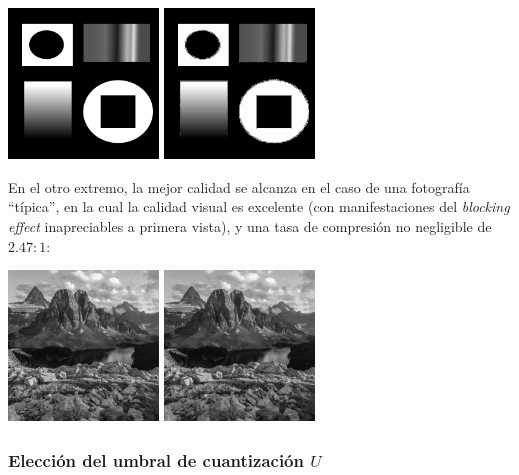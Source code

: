 \documentclass{article}
\begin{document}
\begin{center}
\includegraphics[width=4cm]{../imgs/input/imgs_gray/img00.png}
\includegraphics[width=4cm]{../imgs/output/gray_8_25_1000000/img00.png}
\end{center}

En el otro extremo, la mejor calidad se alcanza en el caso
de una fotografía ``típica'', en la cual la calidad visual es excelente
(con manifestaciones del {\em blocking effect} inapreciables a primera vista),
y una tasa de compresión no negligible de $2.47 : 1$:

\begin{center}
\includegraphics[width=4cm]{../imgs/input/imgs_gray/img01.png}
\includegraphics[width=4cm]{../imgs/output/gray_8_25_1000000/img01.png}
\end{center}

\subsubsection{Elección del umbral de cuantización $U$}
\end{document}
